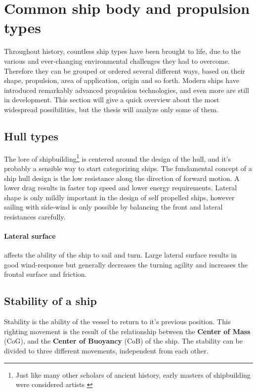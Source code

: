 \section{Common ship body and propulsion types}

Throughout history, countless ship types have been brought to life, due to the various and ever-changing environmental challenges they had to overcome. Therefore they can be grouped or ordered several different ways, based on their shape, propulsion, area of application, origin and so forth. Modern ships have introduced remarkably advanced propulsion technologies, and even more are still in development. This section will give a quick overview about the most widespread possibilities, but the thesis will analyze only some of them.

\subsection{Hull types}

The lore of shipbuilding\footnote{Just like many other scholars of ancient history, early masters of shipbuilding were considered artists \cite{Art_of_shipbuilding}} is centered around the design of the hull, and it's probably a sensible way to start categorizing ships.
The fundamental concept of a ship hull design is the low resistance along the direction of forward motion. A lower drag results in faster top speed and lower energy requirements. Lateral shape is only mildly important in the design of self propelled ships, however sailing with side-wind is only possible by balancing the front and lateral resistances carefully\cite{vitorlazas}.

\paragraph{Lateral surface} affects the ability of the ship to sail and turn. Large lateral surface results in good wind-response but generally decreases the turning agility and increases the frontal surface and friction.

\subsection{Stability of a ship} 

Stability is the ability of the vessel to return to it's previous position\cite{stability}. This righting movement is the result of the relationship between the \textbf{Center of Mass} (CoG), and the \textbf{Center of Buoyancy} (CoB) of the ship. The stability can be divided to three different movements, independent from each other.

